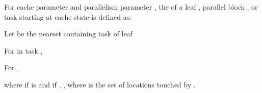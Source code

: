 {\begin{definition}\label{def:qhat}
\vspace{-8pt}
For cache parameter  and parallelism parameter ,
the  of a leaf , parallel block
, or task  starting at cache state  is defined as:

\noindent{} Let  be the nearest containing task of
leaf 
\vspace{-4pt}

\vspace{-4pt}
\noindent{} For  in task , 

\vspace{-4pt}
\noindent{} For , 

where  if  is  and if
, , where
 is the set of locations touched by .
\vspace{-4pt}
\end{definition}
}
